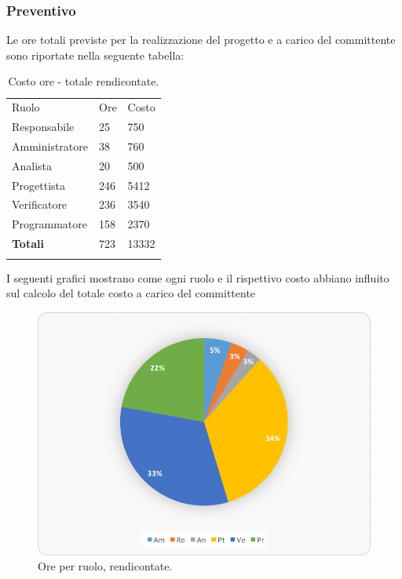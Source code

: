 \documentclass[a4paper]{article}
\begin{document}
			\subsubsection{Preventivo}
				Le ore totali previste per la realizzazione del progetto e a carico del committente sono riportate 
				nella seguente tabella:
				\begin{table}[H]
					\begin{tabularx}{\textwidth}{Y Y Y}
						Ruolo & Ore & Costo \\
						Responsabile & 25 & 750 \\
						Amministratore & 38 & 760 \\
						Analista & 20 & 500\\
						Progettista & 246 & 5412\\
						Verificatore & 236 & 3540\\
						Programmatore & 158 & 2370 \\
						\textbf{Totali} & 723 & 13332 \\
					\end{tabularx}
				\caption{Costo ore - totale rendicontate.}
				\label{TCRendicontati}
				\end{table}
				I seguenti grafici mostrano come ogni ruolo e il rispettivo costo abbiano influito sul calcolo del totale 
				costo a carico del committente
				\begin{figure}[H]
					\centering
					\includegraphics[scale=0.7]{pc_rendicontate}
					\caption{Ore per ruolo, rendicontate.}
				\end{figure}
\end{document}
